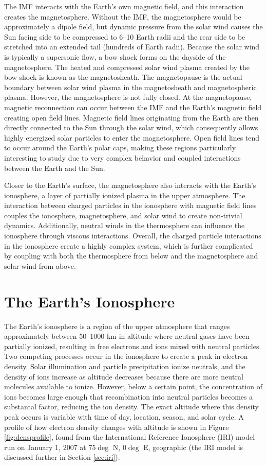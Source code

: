 The IMF interacts with the Earth's own magnetic field, and this interaction creates the magnetosphere.  Without the IMF, the magnetosphere would be approximately a dipole field, but dynamic pressure from the solar wind causes the Sun facing side to be compressed to 6--10 Earth radii and the rear side to be stretched into an extended tail (hundreds of Earth radii).  Because the solar wind is typically a supersonic flow, a bow shock forms on the dayside of the magnetosphere.  The heated and compressed solar wind plasma created by the bow shock is known as the magnetosheath.  The magnetopause is the actual boundary between solar wind plasma in the magnetosheath and magnetospheric plasma.  However, the magnetosphere is not fully closed.  At the magnetopause, magnetic reconnection can occur between the IMF and the Earth's magnetic field creating open field lines.  Magnetic field lines originating from the Earth are then directly connected to the Sun through the solar wind, which consequently allows highly energized solar particles to enter the magnetosphere.  Open field lines tend to occur around the Earth's polar caps, making these regions particularly interesting to study due to very complex behavior and coupled interactions between the Earth and the Sun.

Closer to the Earth's surface, the magnetosphere also interacts with the Earth's ionosphere, a layer of partially ionized plasma in the upper atmosphere.  The interaction between charged particles in the ionosphere with magnetic field lines couples the ionosphere, magnetosphere, and solar wind to create non-trivial dynamics.  Additionally,  neutral winds in the thermosphere can influence the ionosphere through viscous interactions.  Overall, the charged particle interactions in the ionosphere create a highly complex system, which is further complicated by coupling with both the thermosphere from below and the magnetosphere and solar wind from above.  

\section{The Earth's Ionosphere}
\label{sec:ionosphere}
The Earth's ionosphere is a region of the upper atmosphere that ranges approximately between 50--1000 km in altitude where neutral gases have been partially ionized, resulting in free electrons and ions mixed with neutral particles.  Two competing processes occur in the ionosphere to create a peak in electron density.  Solar illumination and particle precipitation ionize neutrals, and the density of ions increase as altitude decreases because there are more neutral molecules available to ionize.  However, below a certain point, the concentration of ions becomes large enough that recombination into neutral particles becomes a substantal factor, reducing the ion density.  The exact altitude where this density peak occurs is variable with time of day, location, season, and solar cycle.  A profile of how electron density changes with altitude is shown in Figure \ref{fig:densprofile}, found from the International Reference Ionosphere (IRI) model run on January 1, 2007 at \(75\deg\) N, \(0\deg\) E, geographic (the IRI model is discussed further in Section \ref{sec:iri}).

